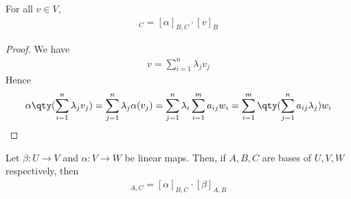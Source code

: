 \begin{lemma}
    For all $v \in V$,
    \begin{align*}
        [\alpha(v)]_C = [\alpha]_{B,C} \cdot [v]_{B}
    \end{align*}
\end{lemma}

\begin{proof}
    We have
    \begin{align*}
        v = \sum_{i=1}^n \lambda_j v_j
    \end{align*}
    Hence
    \begin{align*}
        \alpha\qty(\sum_{i=1}^n \lambda_j v_j) = \sum_{j=1}^n \lambda_j \alpha(v_j) = \sum_{j=1}^n \lambda_i \sum_{i=1}^m a_{ij} w_i = \sum_{i=1}^m \qty( \sum_{j=1}^n a_{ij} \lambda_j ) w_i
    \end{align*}
\end{proof}

\begin{lemma}
    Let $\beta \colon U \to V$ and $\alpha \colon V \to W$ be linear maps.
    Then, if $A,B,C$ are bases of $U,V,W$ respectively, then
    \begin{align*}
        [\alpha \circ \beta]_{A,C} = [\alpha]_{B,C} \cdot [\beta]_{A,B}
    \end{align*}
\end{lemma}

